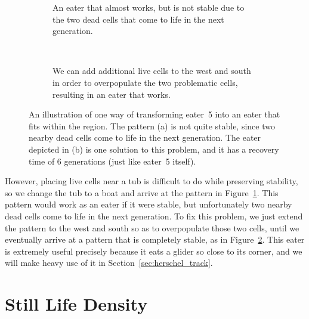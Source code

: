 \begin{figure}[!htb]
	\centering
	\begin{subfigure}{.4\textwidth}
		\centering
		\caption{An eater that almost works, but is not stable due to the two dead  cells that come to life in the next generation.}
		\label{fig:eater_constrained_eater_5_b}
	\end{subfigure} \quad \ %
	\begin{subfigure}{.54\textwidth}
		\centering
		\caption{We can add additional live cells to the west and south in order to overpopulate the two problematic cells, resulting in an eater that works.}
		\label{fig:eater_constrained_done}
	\end{subfigure}
	\caption{An illustration of one way of transforming eater~5 into an eater that fits within the  region. The pattern (a) is not quite stable, since two nearby dead cells come to life in the next generation. The eater depicted in (b) is one solution to this problem, and it has a recovery time of $6$ generations (just like eater~5 itself).}\label{fig:eater_constrained_eater_5_both_done}
\end{figure}

However, placing live cells near a tub is difficult to do while preserving stability, so we change the tub to a boat and arrive at the pattern in Figure~\ref{fig:eater_constrained_eater_5_b}. This pattern would work as an eater if it were stable, but unfortunately two nearby dead cells come to life in the next generation. To fix this problem, we just extend the pattern to the west and south so as to overpopulate those two cells, until we eventually arrive at a pattern that is completely stable, as in Figure~\ref{fig:eater_constrained_done}. This eater is extremely useful precisely because it eats a glider so close to its corner, and we will make heavy use of it in Section~\ref{sec:herschel_track}.


\section{Still Life Density}\label{sec:still_life_density}

